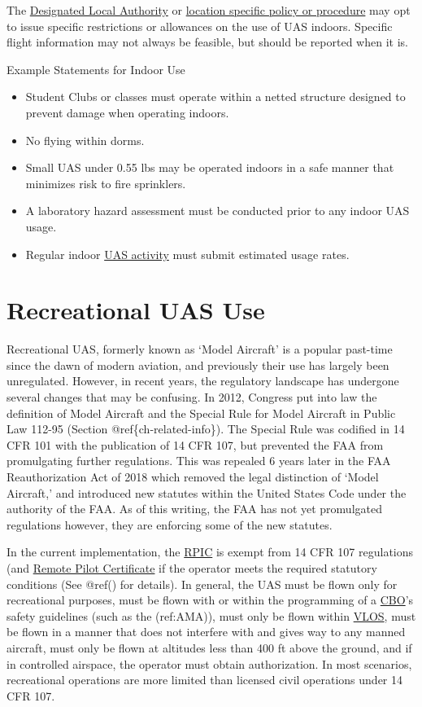 \documentclass[
]{book}
\providecommand{\tightlist}{%
  \setlength{\itemsep}{0pt}\setlength{\parskip}{0pt}}
\begin{document}
The \protect\hyperlink{DLA}{Designated Local Authority} or \protect\hyperlink{LSP}{location specific policy or procedure} may opt to issue specific restrictions or allowances on the use of UAS indoors. Specific flight information may not always be feasible, but should be reported when it is.

Example Statements for Indoor Use

\begin{itemize}
\tightlist
\item
  Student Clubs or classes must operate within a netted structure designed to prevent damage when operating indoors.
\item
  No flying within dorms.
\item
  Small UAS under 0.55 lbs may be operated indoors in a safe manner that minimizes risk to fire sprinklers.
\item
  A laboratory hazard assessment must be conducted prior to any indoor UAS usage.
\item
  Regular indoor \protect\hyperlink{UASactivity}{UAS activity} must submit estimated usage rates.
\end{itemize}

\hypertarget{recreational-uas-use}{%
\section{Recreational UAS Use}\label{recreational-uas-use}}

Recreational UAS, formerly known as `Model Aircraft' is a popular past-time since the dawn of modern aviation, and previously their use has largely been unregulated. However, in recent years, the regulatory landscape has undergone several changes that may be confusing. In 2012, Congress put into law the definition of Model Aircraft and the Special Rule for Model Aircraft in Public Law 112-95 (Section @ref\{ch-related-info\}). The Special Rule was codified in 14 CFR 101 with the publication of 14 CFR 107, but prevented the FAA from promulgating further regulations. This was repealed 6 years later in the FAA Reauthorization Act of 2018 which removed the legal distinction of `Model Aircraft,' and introduced new statutes within the United States Code under the authority of the FAA. As of this writing, the FAA has not yet promulgated regulations however, they are enforcing some of the new statutes.

In the current implementation, the \protect\hyperlink{RPIC}{RPIC} is exempt from 14 CFR 107 regulations (and \protect\hyperlink{RPC}{Remote Pilot Certificate} if the operator meets the required statutory conditions (See @ref() for details). In general, the UAS must be flown only for recreational purposes, must be flown with or within the programming of a \protect\hyperlink{CBO}{CBO}'s safety guidelines (such as the (ref:AMA)), must only be flown within \protect\hyperlink{VLOS}{VLOS}, must be flown in a manner that does not interfere with and gives way to any manned aircraft, must only be flown at altitudes less than 400 ft above the ground, and if in controlled airspace, the operator must obtain authorization. In most scenarios, recreational operations are more limited than licensed civil operations under 14 CFR 107.
\end{document}
